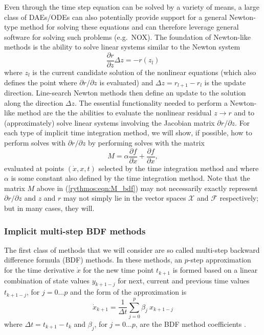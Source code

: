 \documentclass[pdf,ps2pdf,11pt]{SANDreport}
\begin{document}
Even through the time step equation can be solved by a variety of means, a
large class of DAEs/ODEs can also potentially provide support for a general
Newton-type method for solving these equations and can therefore leverage
general software for solving such problems (e.g.\ NOX).  The foundation of
Newton-like methods is the ability to solve linear systems similar to the
Newton system
%
\begin{equation}
\frac{\partial r}{\partial z} \Delta z = - r(z_l)
\end{equation}
%
where $z_l$ is the current candidate solution of the nonlinear equations
(which also defines the point where $\partial r / {}\partial z$ is evaluated)
and $\Delta z = r_{l+1} - r_l$ is the update direction.  Line-search Newton
methods then define an update to the solution along the direction $\Delta z$.
The essential functionality needed to perform a Newton-like method are the the
abilities to evaluate the nonlinear residual $z {}\rightarrow r$ and to
(approximately) solve linear systems involving the Jacobian matrix ${}\partial
r / {}\partial z$.  For each type of implicit time integration method, we will
show, if possible, how to perform solves with ${}\partial r / {}\partial z$ by
performing solves with the matrix
%
\begin{equation}
M = \alpha \frac{\partial f}{\partial \dot{x}} + \frac{\partial f}{\partial x},
\label{rythmos:eqn:M}
\end{equation}
%
evaluated at points $(\dot{x},x,t)$ selected by the time integration method
and where $\alpha$ is some constant also defined by the time integration
method.  Note that the matrix $M$ above in (\ref{rythmos:eqn:M_bdf}) may not
necessarily exactly represent ${}\partial r / {}\partial z$ and $z$ and $r$
may not simply lie in the vector spaces $\mathcal{X}$ and $\mathcal{F}$
respectively; but in many cases, they will.

\subsubsection{Implicit multi-step BDF methods}

The first class of methods that we will consider are so called multi-step
backward difference formula (BDF) methods.  In these methods, an $p$-step
approximation for the time derivative $\dot{x}$ for the new time point
$t_{k+1}$ is formed based on a linear combination of state values $y_{k+1-j}$
for next, current and previous time values $t_{k+1-j}$, for $j = 0 {}\ldots p$
and the form of the approximation is
%
\begin{equation}
\dot{x}_{k+1} = \frac{1}{\Delta t} \sum_{j=0}^{p} \beta_j \: x_{k+1-j}
\label{rythmos:eqn:bdf_x_dot}
\end{equation}
%
where $\Delta t = t_{k+1} - t_k$ and $\beta_j$, for $j=0 {}\ldots p$, are the
BDF method coefficients \cite{AscherPetzold}.
\end{document}
